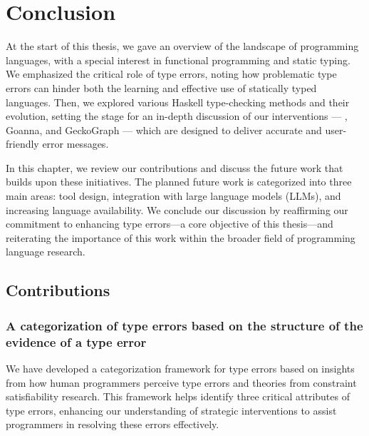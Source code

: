 

\chapter{Conclusion}

\label{chap:conclusion} 
\newcommand{\typetutor}{TypeTutor}

\graphicspath{{Figures/Conclusion}}
At the start of this thesis, we gave an overview of the landscape of programming languages, with a special interest in functional programming and static typing. We emphasized the critical role of type errors, noting how problematic type errors can hinder both the learning and effective use of statically typed languages. Then, we explored various Haskell type-checking methods and their evolution, setting the stage for an in-depth discussion of our interventions --- \chameleon{}, Goanna, and GeckoGraph --- which are designed to deliver accurate and user-friendly error messages.

In this chapter, we review our contributions and discuss the future work that builds upon these initiatives. The planned future work is categorized into three main areas: tool design, integration with large language models (LLMs), and increasing language availability. We conclude our discussion by reaffirming our commitment to enhancing type errors—a core objective of this thesis—and reiterating the importance of this work within the broader field of programming language research.


\section{Contributions}


\subsection{A categorization of type errors based on the structure of the evidence of a type error}


We have developed a categorization framework for type errors based on insights from how human programmers perceive type errors and theories from constraint satisfiability research. This framework helps identify three critical attributes of type errors, enhancing our understanding of strategic interventions to assist programmers in resolving these errors effectively.

